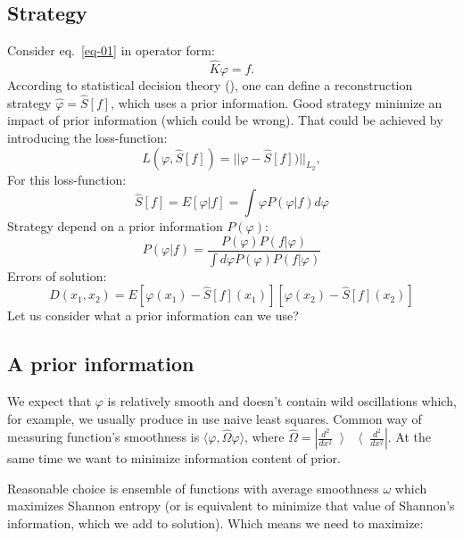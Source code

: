 \documentclass{webofc}
\begin{document}
\subsection{Strategy}\label{sec:theory:strat}
Consider eq.~\ref{eq-01} in operator form:
\begin{equation}
	\label{eq-02}
    \hat{K}\varphi = f.
\end{equation}
According to statistical decision theory (\cite{james2006statistical}), one can define a reconstruction strategy  $\hat{\varphi} = \hat{S}[f]$, which uses a prior information. Good strategy minimize an impact of prior information (which could be wrong). That could be achieved by introducing the loss-function:
\begin{equation*}
	L(\varphi,\hat{S}[f]) = ||\varphi-\hat{S}[f])||_{L_2},
\end{equation*}
For this loss-function:
\begin{equation}
	\label{eq:opt}
	\hat{S}[f] = E[\varphi|f] = \int \varphi P(\varphi|f)d\varphi
\end{equation}
Strategy depend on a prior information $P(\varphi)$:
\begin{equation*}
	P(\varphi|f)= \frac{P(\varphi)P(f|\varphi)}{\int d\varphi P(\varphi)P(f|\varphi)} 
\end{equation*}
Errors of solution:
\begin{equation*}
	D(x_1,x_2)  = E[\varphi(x_1) - \hat{S}[f](x_1)][\varphi(x_2) - \hat{S}[f](x_2)]
\end{equation*}
Let us consider what a prior information can we use? 

\subsection{A prior information}\label{sec:theory:aprior}

We expect that $\varphi$ is relatively smooth and doesn't contain wild
oscillations which, for example, we usually produce in use naive least squares. Common way of measuring
function's smoothness is $\langle\varphi,\hat{\Omega}\varphi\rangle$, where
$\hat{\Omega}=|\frac{d^2}{dx^2}\left\rangle\right\langle\frac{d^2}{dx^2}|$.
At the same time we want to minimize information content of prior. 

Reasonable choice is ensemble of functions with average smoothness $\omega$ which
maximizes Shannon entropy (or is equivalent to minimize that value of Shannon's information, which we add to solution). Which means we need to maximize:
\end{document}
